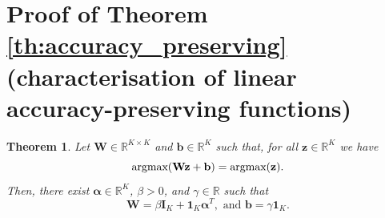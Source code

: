 \documentclass[10pt,dvipsnames]{article}
\newcommand{\bz}{\mathbf{z}}%
\newcommand{\bW}{\mathbf{W}}%
\newcommand{\bb}{\mathbf{b}}%
\newcommand{\ba}{\boldsymbol{\alpha}}%
\newcommand{\bI}{\mathbf{I}}%
\newcommand{\bun}{\mathbf{1}}%
\theoremstyle{plain}
\newtheorem{theorem}{Theorem}[section]
\theoremstyle{definition}
\theoremstyle{remark}
\begin{document}
\section{Proof of Theorem \ref{th:accuracy_preserving} (characterisation of linear accuracy-preserving functions)}
\label{app:accuracy_preserving}
\begin{theorem}
    Let $\bW \in \mathbb{R}^{K \times K}$ and  $\bb \in \mathbb{R}^K$ such that, for all $\bz \in \mathbb{R}^K$ we have
    \begin{equation}
    \label{eq:invarianceapp}
        \textup{argmax}(\bW \bz+\bb) = \textup{argmax}(\bz).
    \end{equation}
Then, there exist $\ba \in \mathbb{R}^K$, $\beta> 0$, and $\gamma \in \mathbb{R}$ such that
\begin{equation}
    \bW = \beta \bI_K + \bun_K \ba ^T, \text{ and } \bb = \gamma \bun_K.
\end{equation}
\end{theorem}
\end{document}
